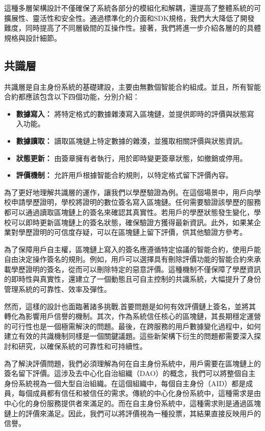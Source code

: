 這種多層架構設計不僅確保了系統各部分的模組化和解耦，還提高了整體系統的可擴展性、靈活性和安全性。通過標準化的介面和SDK規格，我們大大降低了開發難度，同時提高了不同層級間的互操作性。接著，我們將進一步介紹各層的的具體規格與設計細節。
\subsection{共識層}
共識層是自主身份系統的基礎建設，主要由無數個智能合約組成。並且，所有智能合約都應該包含以下四個功能，分別介紹：
\begin{itemize}
  \item \textbf{數據寫入：} 將特定格式的數據雜湊寫入區塊鏈，並提供即時的評價與狀態寫入功能。
  \item \textbf{數據讀取：} 讀取區塊鏈上特定數據的雜湊，並獲取相關評價與狀態資訊。
  \item \textbf{狀態更新：} 由簽章擁有者執行，用於即時變更簽章狀態，如撤銷或停用。
  \item \textbf{評價機制：} 允許用戶根據智能合約規則，以特定格式留下評價內容。
\end{itemize}
為了更好地理解共識層的運作，讓我們以學歷驗證為例。在這個場景中，用戶向學校申請學歷證明，學校將證明的數位簽名寫入區塊鏈。任何需要驗證該學歷的服務都可以通過讀取區塊鏈上的簽名來確認其真實性。若用戶的學歷狀態發生變化，學校可以即時更新區塊鏈上的簽名狀態，確保驗證方獲得最新資訊。此外，如果某企業對學歷證明的可信度存疑，可以在區塊鏈上留下評價，供其他驗證方參考。

為了保障用戶自主權，區塊鏈上寫入的簽名應遵循特定協議的智能合約，使用戶能自由決定操作簽名的規則。例如，用戶可以選擇具有刪除評價功能的智能合約來承載學歷證明的簽名，從而可以刪除特定的惡意評價。這種機制不僅保障了學歷資訊的即時性與真實性，還建立了一個動態且可自主控制的共識系統，大幅提升了身份管理系統的可靠性、效率及彈性。

然而，這樣的設計也面臨著諸多挑戰,首要問題是如何有效評價鏈上簽名，並將其轉化為影響用戶信譽的機制。其次，作為系統信任核心的區塊鏈，其長期穩定運營的可行性也是一個極需解決的問題。最後，在跨服務的用戶數據變化過程中，如何建立有效的共識機制同樣是一個關鍵議題。這些新架構下衍生的問題都需要深入探討和研究，以確保系統的可靠性和可持續性。

為了解決評價問題，我們必須理解為何在自主身份系統中，用戶需要在區塊鏈上的簽名留下評價。這涉及去中心化自治組織（DAO）的概念，我們可以將整個自主身份系統視為一個大型自治組織。在這個組織中，每個自主身份（AID）都是成員，每個成員都有信任和被信任的需求。傳統的中心化身份系統中，這種需求是由中心化的身份服務提供者來滿足的。而在自主身份系統中，這種需求則是通過區塊鏈上的評價來滿足。因此，我們可以將評價視為一種投票，其結果直接反映用戶的信譽。

